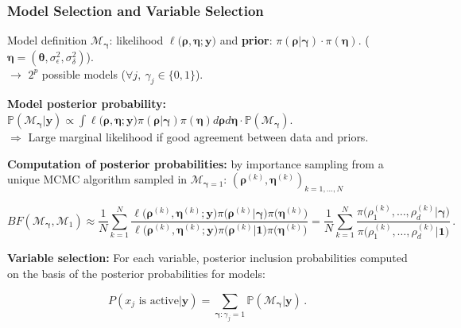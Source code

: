 \documentclass[nopagenumber,9pt]{beamer}
\renewcommand{\P}{\mathbb{P}}
\newcommand{\btheta}{\boldsymbol{\theta}}
\newcommand{\by}{\mathbf{y}}
\newcommand{\brho}{\boldsymbol{\rho}}
\newcommand{\bgamma}{\boldsymbol{\gamma}}
\newcommand{\bsigma}{\boldsymbol{\sigma}}
\newcommand{\bneta}{\boldsymbol{\eta}}
\newcommand{\M}{\mathcal{M}}
\begin{document}
\begin{frame}
\frametitle{Model Selection and Variable Selection} 
 \begin{beamerboxesrounded}{Model definition}
 $\M_{\bgamma}$: likelihood $\ell\big(\brho,\bneta;\by \big)$ and
\textbf{prior}: $\pi(\brho|\bgamma)\cdot \pi(\bneta)$. ($\bneta=(\btheta,\sigma^2_\epsilon,\sigma^2_\delta)$).\\
$\rightarrow$ $2^p$ possible models ($\forall j,\ \gamma_j\in\{0,1\}$).
  \end{beamerboxesrounded}

 
 
 \bigskip
 
 \textbf{Model posterior probability:}
 $\P(\M_{\bgamma}|\by) \propto \int \ell\big(\brho,\bneta;\by \big) \pi(\brho|\bgamma) \pi(\bneta) d\brho d\bneta\cdot \P(\M_{\bgamma})$. 
 \\
 $\Rightarrow$ Large marginal likelihood if good agreement between data and priors.
 
 
 \bigskip
 
 
 \textbf{Computation of posterior probabilities:} by importance sampling from a unique MCMC algorithm sampled in $\M_{\bgamma=1}$: $ \left(\brho^{(k)},\bneta^{(k)}\right)_{k=1,\ldots,N}$

 $$BF(\M_{\bgamma},\M_1) \approx \frac{1}{N}\sum_{k=1}^N \frac{\ell\big(\brho^{(k)},\bneta^{(k)};\by\big)\pi\big(\brho^{(k)}|{\bgamma}\big)\pi\big(\bneta^{(k)}\big)}{\ell\big(\brho^{(k)},\bneta^{(k)};\by\big)\pi\big(\brho^{(k)}|\boldsymbol{1}\big)\pi\big(\bneta^{(k)}\big)}=\frac{1}{N}\sum_{k=1}^N\frac{\pi\big(\rho_1^{(k)},\ldots,\rho_d^{(k)}|{\bgamma}\big)}{\pi\big(\rho_1^{(k)},\ldots,\rho_d^{(k)}|\boldsymbol{1}\big)}\,.$$
 
 \textbf{Variable selection:} 
For each variable, posterior inclusion probabilities computed on the basis of the posterior probabilities for models:

$$P(x_j \text{ is active}|\by)= \sum_{\bgamma:\gamma_j=1}\P(\M_{\bgamma}|\by)\,.$$
 
 \end{frame}
% 
% 
% 
\end{document}
